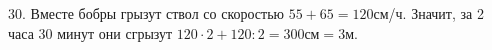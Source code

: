 30. Вместе бобры грызут ствол со скоростью $55+65=120$см/ч. Значит, за 2 часа 30 минут они сгрызут $120\cdot2+120:2=300\text{см}=3$м.\\

